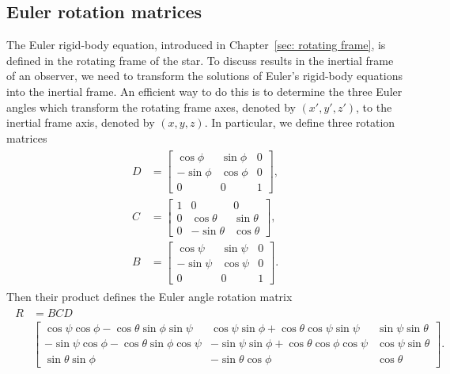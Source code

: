 \documentclass[../full_thesis/full_thesis.tex]{subfiles}
\begin{document}
\subsection{Euler rotation matrices}
\label{sec: euler rotation matrices}
The Euler rigid-body equation, introduced in Chapter~\ref{sec: rotating frame},
is defined in the rotating frame of the star. To discuss results in the
inertial frame of an observer, we need to transform the solutions of Euler's
rigid-body equations into the inertial frame.  An efficient way to do this is
to determine the three Euler angles which transform the rotating frame axes,
denoted by $(x',y', z')$, to the inertial frame axis, denoted by $(x, y, z)$.
In particular, we define three rotation matrices
\begin{align}
\begin{split}
D & = \left[\begin{array}{ccc}
\cos\phi & \sin\phi & 0 \\
-\sin\phi & \cos\phi & 0 \\
0 & 0 & 1
\end{array}
\right],
\\
C & =
\left[\begin{array}{ccc}
1 & 0 & 0 \\
0 & \cos\theta & \sin\theta \\
0 & -\sin\theta & \cos\theta
\end{array}
\right], \\
B & = \left[\begin{array}{ccc}
\cos\psi & \sin\psi & 0 \\
-\sin\psi & \cos\psi & 0 \\
0 & 0 & 1
\end{array}
\right].
\end{split}
\end{align}
Then their product defines the Euler angle rotation matrix
\begin{align}
\begin{split}
R & = BCD \\
& \left[
\begin{array}{ccc}
\cos\psi \cos\phi - \cos\theta \sin\phi \sin \psi &
\cos\psi \sin \phi + \cos\theta \cos \psi \sin \psi &
\sin \psi \sin\theta \\
-\sin\psi \cos\phi - \cos\theta\sin\phi\cos\psi &
-\sin\psi\sin\phi + \cos\theta\cos\phi\cos\psi &
\cos\psi \sin\theta \\
\sin\theta\sin\phi &
-\sin\theta \cos\phi &
\cos\theta
\end{array}
\right].
\end{split}
\label{eqn: rotation matrix}
\end{align}
\end{document}
